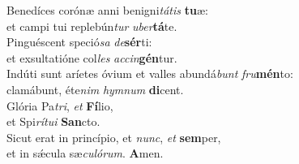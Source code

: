 \evenverse Benedíces corónæ anni benigni\textit{tá}\textit{tis} \textbf{tu}æ:~\*\\
\evenverse et campi tui replebún\textit{tur} \textit{u}\textit{ber}\textbf{tá}te.\\
\oddverse Pinguéscent speció\textit{sa} \textit{de}\textbf{sér}ti:~\*\\
\oddverse et exsultatióne col\textit{les} \textit{ac}\textit{cin}\textbf{gén}tur.\\
\evenverse Indúti sunt aríetes óvium et valles abundá\textit{bunt} \textit{fru}\textbf{mén}to:~\*\\
\evenverse clamábunt, éte\textit{nim} \textit{hym}\textit{num} \textbf{di}cent.\\
\oddverse Glória Pa\textit{tri}, \textit{et} \textbf{Fí}lio,~\*\\
\oddverse et Spi\textit{rí}\textit{tu}\textit{i} \textbf{San}cto.\\
\evenverse Sicut erat in princípio, et \textit{nunc}, \textit{et} \textbf{sem}per,~\*\\
\evenverse et in sǽcula sæ\textit{cu}\textit{ló}\textit{rum}. \textbf{A}men.\\
